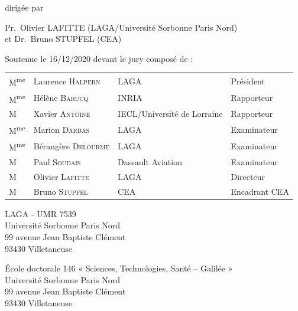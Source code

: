 \begin{titlepage}
\begin{center}
{
    \large dirigée par}

{
    \Large
    Pr.~Olivier LAFITTE (LAGA/Université Sorbonne Paris Nord)\\
    et Dr.~Bruno STUPFEL (CEA)
}



{
    \large Soutenue le 16/12/2020 devant le jury composé de :
}
\newcommand{\mme}{M\textsuperscript{me}}

{
    \large
    \begin{tabular}{llll}
    \mme& Laurence \textsc{Halpern} & LAGA & Président
    \\
    \mme& Hélène \textsc{Barucq} & INRIA & Rapporteur
    \\
    M& Xavier \textsc{Antoine} & IECL/Université de Lorraine & Rapporteur
    \\
    \mme& Marion \textsc{Darbas} & LAGA & Examinateur
    \\
    \mme& Bérangère \textsc{Delourme} & LAGA & Examinateur
    \\
    M& Paul \textsc{Soudais} & Dassault Aviation & Examinateur
    \\
    M& Olivier \textsc{Lafitte} & LAGA & Directeur
    \\
    M& Bruno \textsc{Stupfel} & CEA & Encadrant CEA
    \\
    \end{tabular}
}

\end{center}

\newpage
\thispagestyle{empty}
\vspace*{\fill}

\noindent
\begin{center}
\begin{minipage}[t]{0.5\textwidth}
LAGA - UMR 7539\\
Université Sorbonne Paris Nord\\
99 avenue Jean Baptiste Clément\\
93430 Villetaneuse
\end{minipage}%
%
\hfill%
%
\begin{minipage}[t]{0.5\textwidth}
École doctorale 146 « Sciences, Technologies, Santé – Galilée »\\
Université Sorbonne Paris Nord\\
99 avenue Jean Baptiste Clément\\
93430 Villetaneuse
\end{minipage}
\end{center}



\end{titlepage}
\hypersetup{pageanchor=true}
\cleardoublepage
